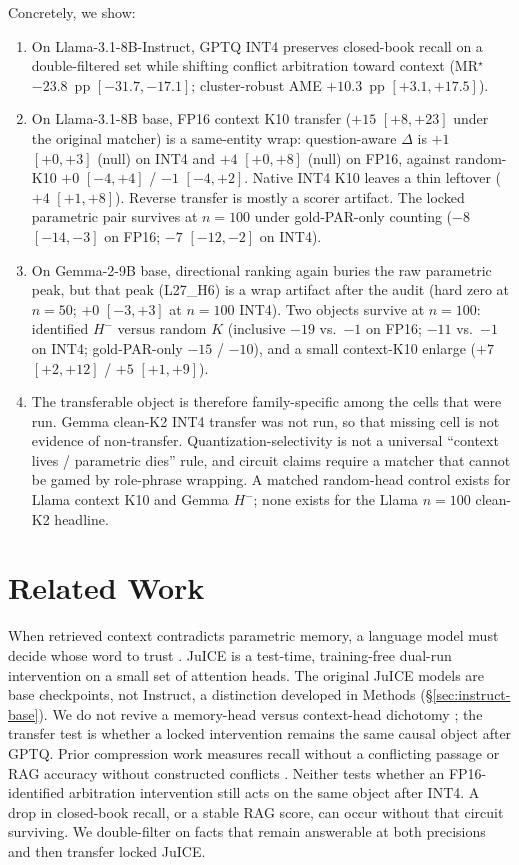 \documentclass{article} %
\begin{document}
Concretely, we show:
\begin{enumerate}
\item On Llama-3.1-8B-Instruct, GPTQ INT4 preserves closed-book recall on a double-filtered set while shifting conflict arbitration toward context (MR$^\star$ $-23.8$~pp $[-31.7,-17.1]$; cluster-robust AME $+10.3$~pp $[+3.1,+17.5]$).
\item On Llama-3.1-8B base, FP16 context K10 transfer ($+15$ $[+8,+23]$ under the original matcher) is a same-entity wrap: question-aware $\Delta$ is $+1$ $[+0,+3]$ (null) on INT4 and $+4$ $[+0,+8]$ (null) on FP16, against random-K10 $+0$ $[-4,+4]$ / $-1$ $[-4,+2]$. Native INT4 K10 leaves a thin leftover ($+4$ $[+1,+8]$). Reverse transfer is mostly a scorer artifact. The locked parametric pair survives at $n{=}100$ under gold-PAR-only counting ($-8$ $[-14,-3]$ on FP16; $-7$ $[-12,-2]$ on INT4).
\item On Gemma-2-9B base, directional ranking again buries the raw parametric peak, but that peak (L27\_H6) is a wrap artifact after the audit (hard zero at $n{=}50$; $+0$ $[-3,+3]$ at $n{=}100$ INT4). Two objects survive at $n{=}100$: identified $H^{-}$ versus random $K$ (inclusive $-19$ vs.\ $-1$ on FP16; $-11$ vs.\ $-1$ on INT4; gold-PAR-only $-15$ / $-10$), and a small context-K10 enlarge ($+7$ $[+2,+12]$ / $+5$ $[+1,+9]$).
\item The transferable object is therefore family-specific among the cells that were run. Gemma clean-K2 INT4 transfer was not run, so that missing cell is not evidence of non-transfer. Quantization-selectivity is not a universal ``context lives / parametric dies'' rule, and circuit claims require a matcher that cannot be gamed by role-phrase wrapping. A matched random-head control exists for Llama context K10 and Gemma $H^{-}$; none exists for the Llama $n{=}100$ clean-K2 headline.
\end{enumerate}

\section{Related Work}
\label{sec:related}

When retrieved context contradicts parametric memory, a language model must decide whose word to trust \citep{xie2024adaptive}. JuICE \citep{li2025taming} is a test-time, training-free dual-run intervention on a small set of attention heads. The original JuICE models are base checkpoints, not Instruct, a distinction developed in Methods (\S\ref{sec:instruct-base}). We do not revive a memory-head versus context-head dichotomy \citep{jin2024tug}; the transfer test is whether a locked intervention remains the same causal object after GPTQ. Prior compression work measures recall without a conflicting passage \citep{wang2026compressed} or RAG accuracy without constructed conflicts \citep{yazan2024rag}. Neither tests whether an FP16-identified arbitration intervention still acts on the same object after INT4. A drop in closed-book recall, or a stable RAG score, can occur without that circuit surviving. We double-filter on facts that remain answerable at both precisions and then transfer locked JuICE.
\end{document}
